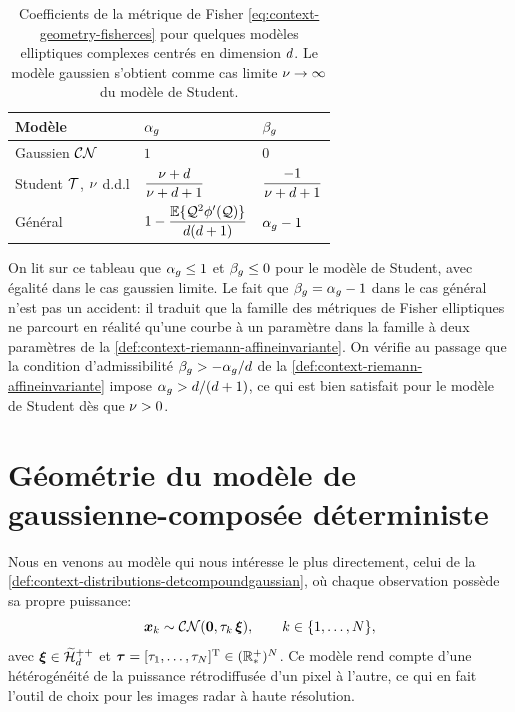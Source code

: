 \begin{table}[h]
  \centering
  \caption{Coefficients de la métrique de Fisher \cref{eq:context-geometry-fisherces} pour quelques modèles elliptiques complexes centrés en dimension $d$. Le modèle gaussien s'obtient comme cas limite $\nu\to\infty$ du modèle de Student.}
  \label{tab:context-geometry-alphabeta}
  \small
  \begin{tabular}{@{}lll@{}}
    \toprule
    Modèle & $\alpha_g$ & $\beta_g$ \\
    \midrule
    Gaussien $\mathcal{CN}$ & $1$ & $0$ \\[0.5ex]
    Student $\mathcal{T}$, $\nu$ d.d.l & $\dfrac{\nu+d}{\nu+d+1}$ & $\dfrac{-1}{\nu+d+1}$ \\[1.2ex]
    Général & $1-\dfrac{\operatorname{\mathbb{E}}\{\mathcal{Q}^2\phi'(\mathcal{Q})\}}{d(d+1)}$ & $\alpha_g-1$ \\
    \bottomrule
  \end{tabular}
\end{table}

\begin{remark}
  On lit sur ce tableau que $\alpha_g\leq 1$ et $\beta_g\leq 0$ pour le modèle de Student, avec égalité dans le cas gaussien limite. Le fait que $\beta_g=\alpha_g-1$ dans le cas général n'est pas un accident: il traduit que la famille des métriques de Fisher elliptiques ne parcourt en réalité qu'une courbe à un paramètre dans la famille à deux paramètres de la \cref{def:context-riemann-affineinvariante}. On vérifie au passage que la condition d'admissibilité $\beta_g>-\alpha_g/d$ de la \cref{def:context-riemann-affineinvariante} impose $\alpha_g>d/(d+1)$, ce qui est bien satisfait pour le modèle de Student dès que $\nu>0$.
\end{remark}


\section{Géométrie du modèle de gaussienne-composée déterministe}
\label{sec:context-geometry-compound-gaussian}

Nous en venons au modèle qui nous intéresse le plus directement, celui de la \cref{def:context-distributions-detcompoundgaussian}, où chaque observation possède sa propre puissance:
\begin{equation}
  \boldsymbol{x}_k \sim \mathcal{CN}(\boldsymbol{0}, \tau_k\,\boldsymbol{\xi}),
  \qquad k\in\{1,\dots,N\},
  \label{eq:context-geometry-ccgmodel}
\end{equation}
avec $\boldsymbol{\xi}\in\widetilde{\mathcal{H}}_{d}^{++}$ et $\boldsymbol{\tau}=[\tau_1,\dots,\tau_N]^{\mathrm{T}}\in(\mathbb{R}_*^+)^{N}$. Ce modèle rend compte d'une hétérogénéité de la puissance rétrodiffusée d'un pixel à l'autre, ce qui en fait l'outil de choix pour les images radar à haute résolution.

